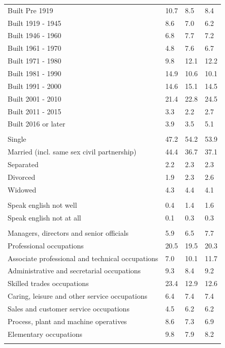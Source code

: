\documentclass{article}
\begin{document}
\begin{table}[h]
\begin{tabular}{KTTT}
    \hline
Built Pre 1919 & 10.7&  8.5&  8.4\\
Built 1919 - 1945 & 8.6& 7.0& 6.2\\
Built  1946 - 1960 & 6.8& 7.7& 7.2\\
Built  1961 - 1970 & 4.8& 7.6& 6.7\\
Built  1971 - 1980 &  9.8& 12.1& 12.2\\
Built  1981 - 1990 & 14.9& 10.6& 10.1\\
Built  1991 - 2000 & 14.6& 15.1& 14.5\\
Built  2001 - 2010 & 21.4& 22.8& 24.5\\
Built  2011 - 2015 & 3.3& 2.2& 2.7\\
Built  2016 or later & 3.9& 3.5& 5.1\\
\hline
    \\
    \hline
Single & 47.2& 54.2& 53.9\\
Married (incl. same sex civil partnership) & 44.4& 36.7& 37.1\\
Separated  & 2.2& 2.3& 2.3\\
Divorced  & 1.9& 2.3& 2.6\\
Widowed & 4.3& 4.4& 4.1\\
\hline
    \\ 
    \hline
Speak english not well & 0.4& 1.4& 1.6\\
Speak english not at all & 0.1& 0.3& 0.3\\
\hline
    \\
    \hline
Managers, directors and senior officials & 5.9& 6.5& 7.7\\
Professional occupations & 20.5& 19.5& 20.3\\
Associate professional and technical occupations &  7.0& 10.1& 11.7\\
Administrative and secretarial occupations & 9.3& 8.4& 9.2\\
Skilled trades occupations & 23.4& 12.9& 12.6\\
Caring, leisure and other service occupations & 6.4& 7.4& 7.4\\
Sales and customer service occupations & 4.5& 6.2& 6.2\\
Process, plant and machine operatives & 8.6& 7.3& 6.9\\
Elementary occupations & 9.8& 7.9& 8.2\\
\hline
\end{tabular}
\end{table}
\end{document}
